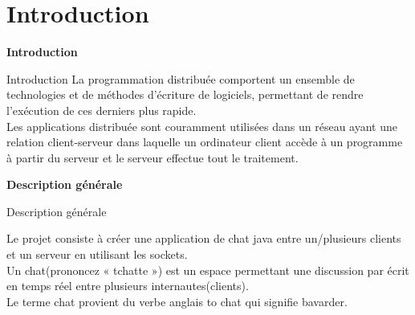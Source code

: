 \documentclass[11pt]{beamer}
\begin{document}
   
 
                 
         
          		\section {Introduction}
          		
          		\begin{frame}{\textbf {Introduction}}
             
         \begin{block}{Introduction}
         \large
La programmation distribuée comportent un ensemble de technologies et de méthodes d'écriture de logiciels, permettant de rendre l'exécution de ces derniers plus rapide.\\
Les applications distribuée sont couramment utilisées dans un réseau ayant une relation client-serveur dans laquelle un ordinateur client accède à un programme à partir du serveur et le serveur effectue tout le traitement.
\end{block}                      
             
   \end{frame} 
        		
        		
 \begin{frame}{ \textbf {Description générale}}
             
         \begin{block}{Description générale}

\large
Le projet consiste à créer une application de chat java entre un/plusieurs clients et un serveur en utilisant les sockets.\\
Un chat(prononcez « tchatte ») est un espace permettant une discussion par écrit en temps réel entre plusieurs internautes(clients).\\

Le terme chat provient du verbe anglais to chat qui signifie bavarder.
\end{block}                           
  \end{frame}  
  
\end{document}
